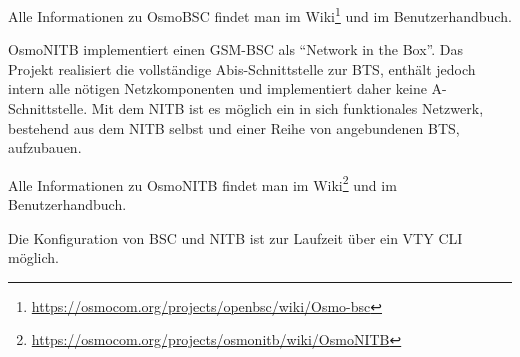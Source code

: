 Alle Informationen zu OsmoBSC findet man im Wiki\footnote{\url{https://osmocom.org/projects/openbsc/wiki/Osmo-bsc}} und im Benutzerhandbuch.

OsmoNITB implementiert einen \ac{GSM}-\ac{BSC} als "`Network in the Box"'. Das Projekt realisiert die vollständige Abis-Schnittstelle zur \ac{BTS}, enthält jedoch intern alle nötigen Netzkomponenten und implementiert daher keine A-Schnittstelle. Mit dem \ac{NITB} ist es möglich ein in sich funktionales Netzwerk, bestehend aus dem \ac{NITB} selbst und einer Reihe von angebundenen \ac{BTS}, aufzubauen. \citep[OsmoNITB Benutzerhandbuch]{osmocom:docs-latest}

Alle Informationen zu OsmoNITB findet man im Wiki\footnote{\url{https://osmocom.org/projects/osmonitb/wiki/OsmoNITB}} und im Benutzerhandbuch.

Die Konfiguration von \ac{BSC} und \ac{NITB} ist zur Laufzeit über ein \ac{VTY} \ac{CLI} möglich.
